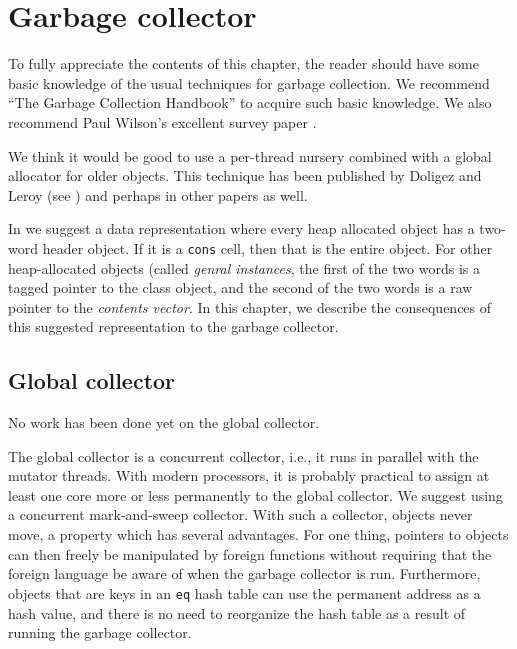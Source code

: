 \chapter{Garbage collector}

To fully appreciate the contents of this chapter, the reader should
have some basic knowledge of the usual techniques for garbage
collection.  We recommend ``The Garbage Collection Handbook''
\cite{Jones:2011:GCH:2025255} to acquire such basic knowledge.  We
also recommend Paul Wilson's excellent survey paper
\cite{Wilson:1992:UGC:645648.664824}.

We think it would be good to use a per-thread nursery combined with a
global allocator for older objects.  This technique has been published
by Doligez and Leroy (see \cite{Doligez:1993:CGG:158511.158611}) and
perhaps in other papers as well.

In  we suggest a data representation
where every heap allocated object has a two-word header object.  If it
is a \texttt{cons} cell, then that is the entire object.  For other
heap-allocated objects (called \emph{genral instances}, the first of
the two words is a tagged pointer to the class object, and the second
of the two words is a raw pointer to the \emph{contents vector}.  In
this chapter, we describe the consequences of this suggested
representation to the garbage collector.

\section{Global collector}
No work has been done yet on the global collector.  

The global collector is a concurrent collector, i.e., it runs in
parallel with the mutator threads.  With modern processors, it is
probably practical to assign at least one core more or less
permanently to the global collector.  We suggest using a concurrent
mark-and-sweep collector.  With such a collector, objects
never move, a property which has several advantages.  For one thing,
pointers to objects can then freely be manipulated by foreign
functions without requiring that the foreign language be aware of when
the garbage collector is run.  Furthermore, objects that are keys in
an \texttt{eq} hash table can use the permanent address as a hash
value, and there is no need to reorganize the hash table as a result
of running the garbage collector. 

